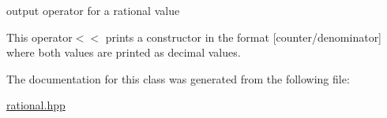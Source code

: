 output operator for a rational value 

This operator$<$$<$ prints a constructor in the format \mbox{[}counter/denominator\mbox{]} where both values are printed as decimal values. 

The documentation for this class was generated from the following file\+:\begin{DoxyCompactItemize}
\item 
\hyperlink{rational_8hpp}{rational.\+hpp}\end{DoxyCompactItemize}
